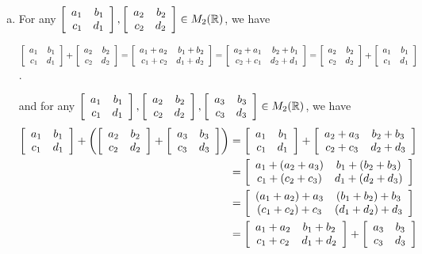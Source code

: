 \documentclass[11pt,fleqn,dvipsnames,usenames]{article}
\begin{document}
\solution
\begin{enumerate}[(a)]
\item For any $\MATRIX{rr}{a_{1} & b_{1}\\c_{1} & d_{1}}, \MATRIX{rr}{a_{2} & b_{2}\\c_{2} & d_{2}}\in M_{2}(\R)$, we have
\begin{adjustwidth}{-50pt}{-50pt}
\begin{center}
$\MATRIX{rr}{a_{1} & b_{1}\\c_{1} & d_{1}} + \MATRIX{rr}{a_{2} & b_{2}\\c_{2} & d_{2}} = \MATRIX{rr}{a_{1} + a_{2} & b_{1} + b_{2}\\c_{1} + c_{2} & d_{1} + d_{2}} = \MATRIX{rr}{a_{2} + a_{1} & b_{2} + b_{1}\\c_{2} + c_{1} & d_{2} + d_{1}} = \MATRIX{rr}{a_{2} & b_{2}\\c_{2} & d_{2}} + \MATRIX{rr}{a_{1} & b_{1}\\c_{1} & d_{1}}$.
\end{center}
\end{adjustwidth}
and for any $\MATRIX{rr}{a_{1} & b_{1}\\c_{1} & d_{1}}, \MATRIX{rr}{a_{2} & b_{2}\\c_{2} & d_{2}}, \MATRIX{rr}{a_{3} & b_{3}\\c_{3} & d_{3}}\in M_{2}(\R)$, we have
\begin{align*}
\MATRIX{cc}{a_{1} & b_{1}\\c_{1} & d_{1}} + \left(\MATRIX{cc}{a_{2} & b_{2}\\c_{2} & d_{2}} + \MATRIX{cc}{a_{3} & b_{3}\\c_{3} & d_{3}}\right) &= \MATRIX{rr}{a_{1} & b_{1}\\c_{1} & d_{1}} + \MATRIX{cc}{a_{2} + a_{3} & b_{2} + b_{3}\\c_{2} + c_{3} & d_{2} + d_{3}}\\
&= \MATRIX{cc}{a_{1} + (a_{2} + a_{3}) & b_{1} + (b_{2} + b_{3})\\c_{1} + (c_{2} + c_{3}) & d_{1} + (d_{2} + d_{3})}\\
&= \MATRIX{cc}{(a_{1} + a_{2}) + a_{3} & (b_{1} + b_{2}) + b_{3}\\(c_{1} + c_{2}) + c_{3} & (d_{1} + d_{2}) + d_{3}}\\
&= \MATRIX{cc}{a_{1} + a_{2} & b_{1} + b_{2}\\c_{1} + c_{2} & d_{1} + d_{2}}  + \MATRIX{cc}{a_{3} & b_{3}\\c_{3} & d_{3}}\\

\end{align*}
\end{enumerate}
\end{document}
